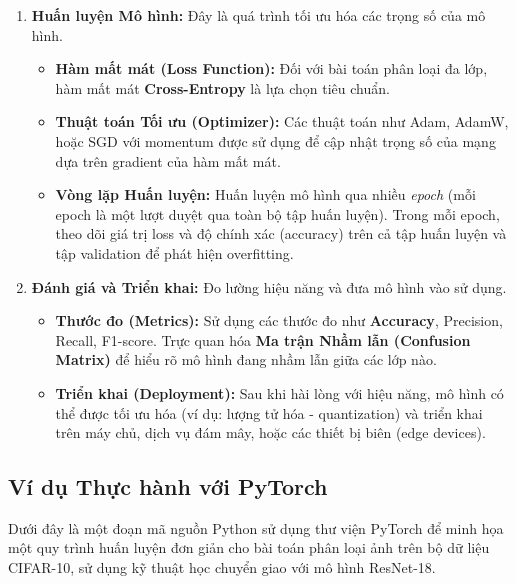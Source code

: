 \begin{enumerate}
    \item \textbf{Huấn luyện Mô hình:}
    Đây là quá trình tối ưu hóa các trọng số của mô hình.
    \begin{itemize}
        \item \textbf{Hàm mất mát (Loss Function):} Đối với bài toán phân loại đa lớp, hàm mất mát \textbf{Cross-Entropy} là lựa chọn tiêu chuẩn.
        \item \textbf{Thuật toán Tối ưu (Optimizer):} Các thuật toán như Adam, AdamW, hoặc SGD với momentum được sử dụng để cập nhật trọng số của mạng dựa trên gradient của hàm mất mát.
        \item \textbf{Vòng lặp Huấn luyện:} Huấn luyện mô hình qua nhiều \textit{epoch} (mỗi epoch là một lượt duyệt qua toàn bộ tập huấn luyện). Trong mỗi epoch, theo dõi giá trị loss và độ chính xác (accuracy) trên cả tập huấn luyện và tập validation để phát hiện overfitting.
    \end{itemize}

    \item \textbf{Đánh giá và Triển khai:}
    Đo lường hiệu năng và đưa mô hình vào sử dụng.
    \begin{itemize}
        \item \textbf{Thước đo (Metrics):} Sử dụng các thước đo như \textbf{Accuracy}, Precision, Recall, F1-score. Trực quan hóa \textbf{Ma trận Nhầm lẫn (Confusion Matrix)} để hiểu rõ mô hình đang nhầm lẫn giữa các lớp nào.
        \item \textbf{Triển khai (Deployment):} Sau khi hài lòng với hiệu năng, mô hình có thể được tối ưu hóa (ví dụ: lượng tử hóa - quantization) và triển khai trên máy chủ, dịch vụ đám mây, hoặc các thiết bị biên (edge devices).
    \end{itemize}
\end{enumerate}

\subsection{Ví dụ Thực hành với PyTorch}
\label{subsec:pytorch_example}
Dưới đây là một đoạn mã nguồn Python sử dụng thư viện PyTorch để minh họa một quy trình huấn luyện đơn giản cho bài toán phân loại ảnh trên bộ dữ liệu CIFAR-10, sử dụng kỹ thuật học chuyển giao với mô hình ResNet-18.

